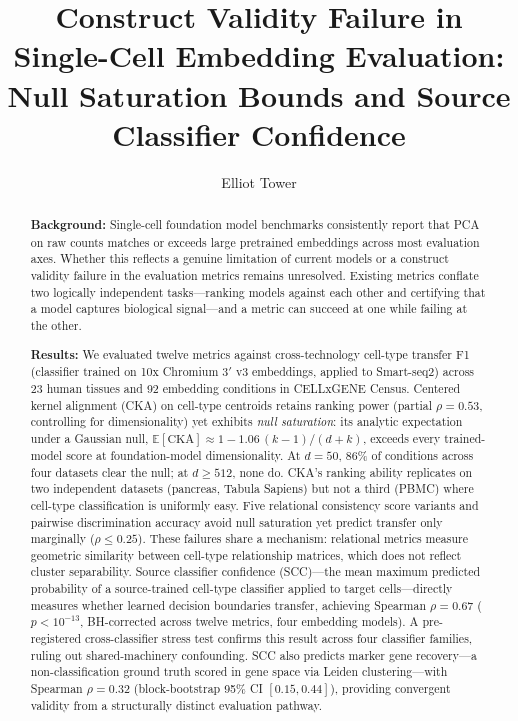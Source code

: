 \documentclass[11pt]{article}
\title{Construct Validity Failure in Single-Cell Embedding Evaluation:\\
Null Saturation Bounds and Source Classifier Confidence}
\author{Elliot Tower}
\affil{Visiting Researcher, University of Edinburgh \\ \texttt{elliot@mechanisticresearch.org}}
\date{}
\begin{document}
\linenumbers
\maketitle

\begin{abstract}

\textbf{Background:}
Single-cell foundation model benchmarks consistently report that PCA
on raw counts matches or exceeds large pretrained embeddings across
most evaluation axes. Whether this reflects a genuine limitation of
current models or a construct validity failure in the evaluation
metrics remains unresolved. Existing metrics conflate two logically
independent tasks---ranking models against each other and certifying
that a model captures biological signal---and a metric can succeed at
one while failing at the other.

\textbf{Results:}
We evaluated twelve metrics against cross-technology cell-type
transfer F1 (classifier trained on 10x Chromium 3$'$ v3 embeddings,
applied to Smart-seq2) across 23 human tissues and 92 embedding
conditions in CELLxGENE Census. Centered kernel alignment (CKA) on
cell-type centroids retains ranking power (partial $\rho = 0.53$,
controlling for dimensionality) yet exhibits \emph{null saturation}:
its analytic expectation under a Gaussian null,
$\mathbb{E}[\mathrm{CKA}] \approx 1 - 1.06\,(k{-}1)/(d{+}k)$,
exceeds every trained-model score at foundation-model dimensionality.
At $d = 50$, 86\% of conditions across four datasets clear the null;
at $d \geq 512$, none do. CKA's ranking ability replicates on two
independent datasets (pancreas, Tabula Sapiens) but not a third
(PBMC) where cell-type classification is uniformly easy. Five
relational consistency score variants and pairwise discrimination
accuracy avoid null saturation yet predict transfer only marginally
($\rho \leq 0.25$). These failures share a mechanism: relational
metrics measure geometric similarity between cell-type relationship
matrices, which does not reflect cluster separability. Source
classifier confidence (SCC)---the mean maximum predicted probability
of a source-trained cell-type classifier applied to target
cells---directly measures whether learned decision boundaries
transfer, achieving Spearman $\rho = 0.67$ ($p < 10^{-13}$,
BH-corrected across twelve metrics, four embedding models). A
pre-registered cross-classifier stress test confirms this result
across four classifier families, ruling out shared-machinery
confounding. SCC also predicts marker gene recovery---a
non-classification ground truth scored in gene space via Leiden
clustering---with Spearman $\rho = 0.32$ (block-bootstrap 95\% CI
$[0.15, 0.44]$), providing convergent validity from a structurally
distinct evaluation pathway.


\end{abstract}
\end{document}
